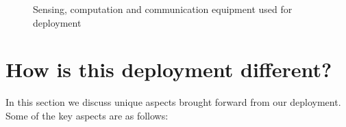 \documentclass[10pt]{sensys-proc}
\begin{document}
\begin{figure}
            \hspace{1mm}
                  \hspace{1mm}

    \caption{Sensing, computation and communication equipment used for deployment}

    \label{fig:deployment}

\end{figure}

\section{How is this deployment different?}
\label{sec:learning}
In this section we discuss unique aspects brought forward from our deployment. Some of the key aspects are as follows:
\end{document}
